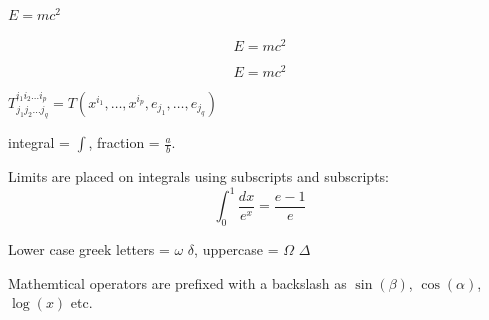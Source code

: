 \documentclass[12pt, a4paper]{article} %
\begin{document}
\begin{math}
	E=mc^2	
\end{math}

\[E=mc^2\] 

\begin{equation}
	E=mc^2
\end{equation}

\begin{math}
	T^{i_1 i_2 \dots i_p}_{j_1 j_2 \dots j_q} = T(x^{i_1}, \dots, x^{i_p}, e_{j_1}, \dots, e_{j_q})
\end{math}

\vspace{5mm}

integral = $\int$, fraction = $\frac{a}{b}$.

Limits are placed on integrals using subscripts and subscripts:
\[ \int_0^1 \frac{dx}{e^x} = \frac{e-1}{e}\]

Lower case greek letters = $\omega$ $\delta$, uppercase = $\Omega$ $\Delta$

Mathemtical operators are prefixed with a backslash as $\sin(\beta)$, $\cos(\alpha)$, $\log(x)$ etc.
\end{document}
